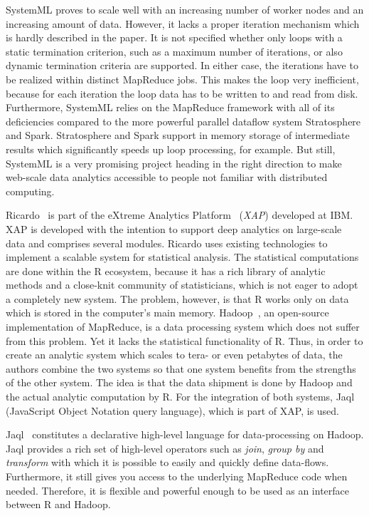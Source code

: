 SystemML proves to scale well with an increasing number of worker nodes and an increasing amount of data.
However, it lacks a proper iteration mechanism which is hardly described in the paper.
It is not specified whether only loops with a static termination criterion, such as a maximum number of iterations, or also dynamic termination criteria are supported.
In either case, the iterations have to be realized within distinct MapReduce jobs.
This makes the loop very inefficient, because for each iteration the loop data has to be written to and read from disk.
Furthermore, SystemML relies on the MapReduce framework with all of its deficiencies compared to the more powerful parallel dataflow system Stratosphere and Spark.
Stratosphere and Spark support in memory storage of intermediate results which significantly speeds up loop processing, for example.
But still, SystemML is a very promising project heading in the right direction to make web-scale data analytics accessible to people not familiar with distributed computing.

Ricardo~\cite{das:2010a} is part of the eXtreme Analytics Platform~\cite{balmin:jrd2013a} (\emph{XAP}) developed at IBM.
XAP is developed with the intention to support deep analytics on large-scale data and comprises several modules.
Ricardo uses existing technologies to implement a scalable system for statistical analysis.
The statistical computations are done within the R ecosystem, because it has a rich library of analytic methods and a close-knit community of statisticians, which is not eager to adopt a completely new system.
The problem, however, is that R works only on data which is stored in the computer's main memory.
Hadoop~\cite{hadoop:2008a}, an open-source implementation of MapReduce, is a data processing system which does not suffer from this problem.
Yet it lacks the statistical functionality of R.
Thus, in order to create an analytic system which scales to tera- or even petabytes of data, the authors combine the two systems so that one system benefits from the strengths of the other system.
The idea is that the data shipment is done by Hadoop and the actual analytic computation by R.
For the integration of both systems, Jaql (JavaScript Object Notation query language), which is part of XAP, is used.

Jaql~\cite{beyer:2011a} constitutes a declarative high-level language for data-processing on Hadoop.
Jaql provides a rich set of high-level operators such as \emph{join}, \emph{group by} and \emph{transform} with which it is possible to easily and quickly define data-flows.
Furthermore, it still gives you access to the underlying MapReduce code when needed.
Therefore, it is flexible and powerful enough to be used as an interface between R and Hadoop.

